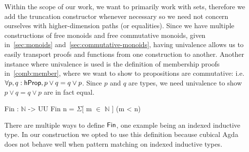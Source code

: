 Within the scope of our work, we want to primarily work with
sets, therefore we add the truncation constructor whenever necessary so we need not concern ourselves
with higher-dimension paths (or equalities). Since we have multiple constructions of free monoids
and free commutative monoids, given in~\cref{sec:monoids} and~\cref{sec:commutative-monoids},
having univalence allows us to easily transport proofs and functions from one construction to another.
Another instance where univalence is used is the definition of membership proofs in~\cref{comb:member},
where we want to show to propositions are commutative: i.e. $\forall p, q: \mathsf{hProp}, p \vee q = q \vee p$.
Since $p$ and $q$ are types, we need univalence to show $p \vee q = q \vee p$ are in fact equal.

\begin{code}
Fin : $\mathbb{N}$ -> UU
Fin n = $\Sigma$[ m $\in$ $\mathbb{N}$ ] (m < n)
\end{code}

There are multiple ways to define $\Fin$, one example being an indexed inductive type.
In our construction we opted to use this definition because cubical Agda does not behave well
when pattern matching on indexed inductive types.

